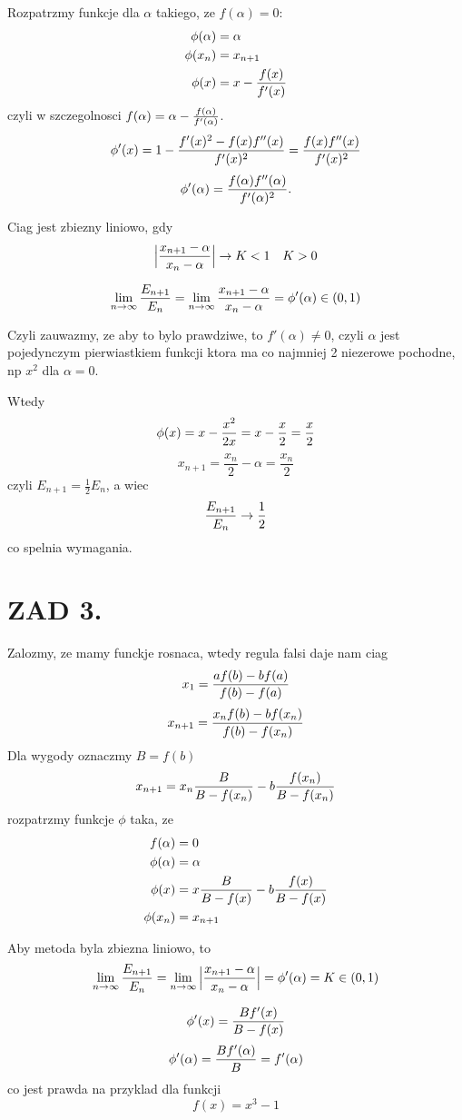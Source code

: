 \documentclass{article}[13pt]
\begin{document}
    Rozpatrzmy funkcje dla $\alpha$ takiego, ze $f(\alpha)=0$:
    \begin{align*}
        \phi(\alpha)&=\alpha\\
        \phi(x_n)&=x_{n+1}\\
        \phi(x)&=x-{f(x)\over f'(x)}
    \end{align*}
    czyli w szczegolnosci $f(\alpha)=\alpha-{f(\alpha)\over f'(\alpha)}$.
    $$\phi'(x)=1-{f'(x)^2-f(x)f''(x)\over f'(x)^2}={f(x)f''(x)\over f'(x)^2}$$
    $$\phi'(\alpha)={f(\alpha)f''(\alpha)\over f'(\alpha)^2}.$$
    
    Ciag jest zbiezny liniowo, gdy
    $$\Big |{x_{n+1}-\alpha\over x_n-\alpha}\Big |\to K < 1\quad K>0$$

    $$\lim\limits_{n\to\infty}{E_{n+1}\over E_n}=\lim\limits_{n\to\infty}{x_{n+1}-\alpha\over x_n-\alpha}=\phi'(\alpha)\in (0,1)$$

    Czyli zauwazmy, ze aby to bylo prawdziwe, to $f'(\alpha)\neq 0$, czyli $\alpha$ jest pojedynczym pierwiastkiem funkcji ktora ma co najmniej 2 niezerowe pochodne, np $x^2$ dla $\alpha=0$.
    \medskip

    Wtedy
    $$\phi(x)=x-{x^2\over 2x}=x-\frac x2=\frac x2$$
    $$x_{n+1}=\frac{x_n}2-\alpha=\frac{x_n}2$$
    czyli $E_{n+1}=\frac12E_n$, a wiec
    $${E_{n+1}\over E_n}\to \frac12$$
    co spelnia wymagania.

    \section*{ZAD 3.}

    Zalozmy, ze mamy funckje rosnaca, wtedy regula falsi daje nam ciag
    $$x_1={af(b)-bf(a)\over f(b)-f(a)}$$
    $$x_{n+1}={x_n f(b)-bf(x_n)\over f(b)-f(x_n)}$$
    Dla wygody oznaczmy $B=f(b)$
    $$x_{n+1}=x_n{B\over B-f(x_n)}-b{f(x_n)\over B-f(x_n)}$$
    rozpatrzmy funkcje $\phi$ taka, ze
    \begin{align*}
        f(\alpha)&=0\\
        \phi(\alpha)&=\alpha\\
        \phi(x)&=x{B\over B-f(x)}-b{f(x)\over B-f(x)}\\
        \phi(x_n)&=x_{n+1}
    \end{align*}

    Aby metoda byla zbiezna liniowo, to 
    $$\lim\limits_{n\to\infty}{E_{n+1}\over E_n}=\lim\limits_{n\to\infty}\Big |{x_{n+1}-\alpha\over x_n-\alpha}\Big |=\phi'(\alpha)= K\in (0,1)$$

    $$\phi'(x)={Bf'(x)\over B-f(x)}$$
    $$\phi'(\alpha)={Bf'(\alpha)\over B}=f'(\alpha)$$
    co jest prawda na przyklad dla funkcji
    $$f(x)=x^3-1$$
    
\end{document}
